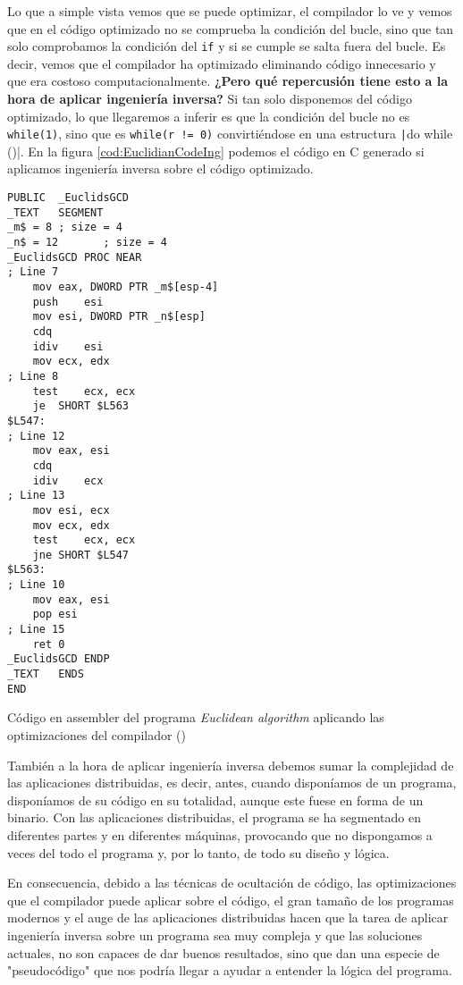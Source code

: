 Lo que a simple vista vemos que se puede optimizar, el compilador lo ve y vemos que en el código
optimizado no se comprueba la condición del bucle, sino que tan solo comprobamos la condición
del \texttt{if} y si se cumple se salta fuera del bucle. Es decir, vemos que el compilador
ha optimizado eliminando código innecesario y que era costoso computacionalmente. \textbf{¿Pero qué
repercusión tiene esto a la hora de aplicar ingeniería inversa?} Si tan solo disponemos del código
optimizado, lo que llegaremos a inferir es que la condición del bucle no es \texttt{while(1)},
sino que es \texttt{while(r != 0)} convirtiéndose en una estructura \texttt|do {} while ()|.
En la figura \ref{cod:EuclidianCodeIng} podemos el código en C generado si aplicamos ingeniería inversa sobre
el código optimizado.

\begin{mycode}
    \begin{verbatim}
PUBLIC	_EuclidsGCD
_TEXT	SEGMENT
_m$ = 8	; size = 4
_n$ = 12       ; size = 4
_EuclidsGCD PROC NEAR	
; Line 7
    mov	eax, DWORD PTR _m$[esp-4]
    push	esi
    mov	esi, DWORD PTR _n$[esp]
    cdq
    idiv	esi
    mov	ecx, edx
; Line 8
    test	ecx, ecx
    je	SHORT $L563
$L547:
; Line 12
    mov	eax, esi
    cdq
    idiv	ecx
; Line 13
    mov	esi, ecx
    mov	ecx, edx
    test	ecx, ecx
    jne	SHORT $L547
$L563:
; Line 10
    mov	eax, esi
    pop	esi
; Line 15
    ret	0
_EuclidsGCD ENDP
_TEXT	ENDS
END
    \end{verbatim}
    \caption[Código en assembler del programa \textit{Euclidean algorithm} aplicando las optimizaciones del compilador]{Código en assembler del programa \textit{Euclidean algorithm} aplicando las optimizaciones del compilador (\cite{EuclidianCode})}
    \label{cod:EuclidianCodeAsmOpt}
\end{mycode}

También a la hora de aplicar ingeniería inversa debemos sumar la complejidad de las aplicaciones
distribuidas, es decir, antes, cuando disponíamos de un programa, disponíamos de su código en
su totalidad, aunque este fuese en forma de un binario. Con las aplicaciones distribuidas, el
programa se ha segmentado en diferentes partes y en diferentes máquinas, provocando que no
dispongamos a veces del todo el programa y, por lo tanto, de todo su diseño y lógica.

En consecuencia, debido a las técnicas de ocultación de código, las optimizaciones que el compilador
puede aplicar sobre el código, el gran tamaño de los programas modernos y el auge de las aplicaciones
distribuidas hacen que la tarea de aplicar ingeniería inversa sobre un programa sea muy compleja y
que las soluciones actuales, no son capaces de dar buenos resultados, sino que dan una especie de
"pseudocódigo" que nos podría llegar a ayudar a entender la lógica del programa.

